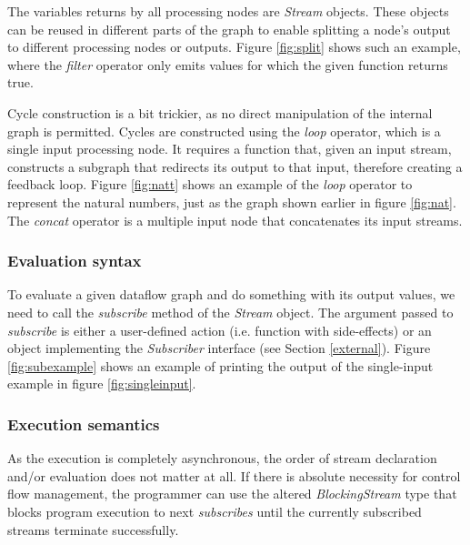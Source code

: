 \documentclass[sigplan,review,anonymous]{acmart}
\begin{document}

The variables returns by all processing nodes are \textit{Stream} objects. These
objects can be reused in different parts of the graph to enable splitting a
node's output to different processing nodes or outputs. Figure \ref{fig:split}
shows such an example, where the \textit{filter} operator only emits values for
which the given function returns true.


Cycle construction is a bit trickier, as no direct manipulation of the internal
graph is permitted. Cycles are constructed using the \textit{loop} operator,
which is a single input processing node. It requires a function that, given an
input stream, constructs a subgraph that redirects its output to that input,
therefore creating a feedback loop. Figure \ref{fig:natt} shows an example of
the \textit{loop} operator to represent the natural numbers, just as the graph
shown earlier in figure \ref{fig:nat}. The \textit{concat} operator is a
multiple input node that concatenates its input streams.


\subsubsection{Evaluation syntax}

To evaluate a given dataflow graph and do something with its output values, we
need to call the \textit{subscribe} method of the \textit{Stream} object. The
argument passed to \textit{subscribe} is either a user-defined action (i.e.
function with side-effects) or an object implementing the \textit{Subscriber}
interface (see Section \ref{external}). Figure \ref{fig:subexample} shows an
example of printing the output of the single-input example in figure
\ref{fig:singleinput}.


\subsubsection{Execution semantics}

As the execution is completely asynchronous, the order of stream declaration
and/or evaluation does not matter at all. If there is absolute necessity for
control flow management, the programmer can use the altered
\textit{BlockingStream} type that blocks program execution to next
\textit{subscribes} until the currently subscribed streams terminate
successfully.
\end{document}
